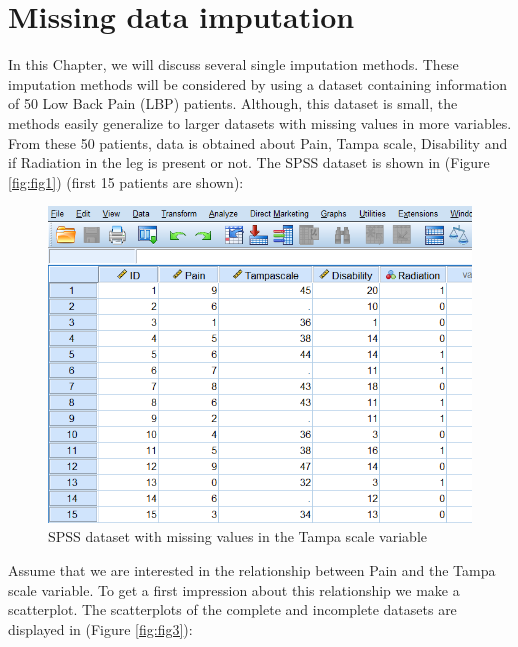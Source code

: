 \documentclass[]{book}
\begin{document}
\section{Missing data imputation}\label{missing-data-imputation}

In this Chapter, we will discuss several single imputation methods.
These imputation methods will be considered by using a dataset
containing information of 50 Low Back Pain (LBP) patients. Although,
this dataset is small, the methods easily generalize to larger datasets
with missing values in more variables. From these 50 patients, data is
obtained about Pain, Tampa scale, Disability and if Radiation in the leg
is present or not. The SPSS dataset is shown in (Figure \ref{fig:fig1})
(first 15 patients are shown):

\begin{figure}

{\centering \includegraphics[width=0.9\linewidth]{images/fig3.1} 

}

\caption{SPSS dataset with missing values in the Tampa scale variable}\label{fig:fig50}
\end{figure}

Assume that we are interested in the relationship between Pain and the
Tampa scale variable. To get a first impression about this relationship
we make a scatterplot. The scatterplots of the complete and incomplete
datasets are displayed in (Figure \ref{fig:fig3}):
\end{document}

